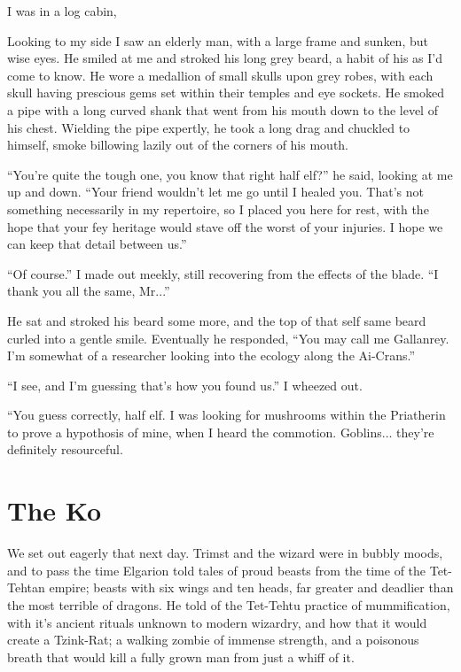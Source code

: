 \documentclass[12pt, a4paper]{book}
\begin{document}
I was in a log cabin, 

Looking to my side I saw an elderly man, with a large frame and sunken, but wise eyes. He smiled at me and stroked his long grey beard, a habit of his as I'd come to know. He wore a medallion of small skulls upon grey robes, with each skull having prescious gems set within their temples and eye sockets. He smoked a pipe with a long curved shank that went from his mouth down to the level of his chest. Wielding the pipe expertly, he took a long drag and chuckled to himself, smoke billowing lazily out of the corners of his mouth.

``You're quite the tough one, you know that right half elf?'' he said, looking at me up and down. ``Your friend wouldn't let me go until I healed you. That's not something necessarily in my repertoire, so I placed you here for rest, with the hope that your fey heritage would stave off  the worst of your injuries. I hope we can keep that detail between us.''

``Of course.'' I made out meekly, still recovering from the effects of the blade. ``I thank you all the same, Mr...''

He sat and stroked his beard some more, and the top of that self same beard curled into a gentle smile. Eventually he responded, ``You may call me Gallanrey. I'm somewhat of a researcher looking into the ecology along the Ai-Crans.''

``I see, and I'm guessing that's how you found us.'' I wheezed out.

``You guess correctly, half elf. I was looking for mushrooms within the Priatherin to prove a hypothosis of mine, when I heard the commotion. Goblins... they're definitely resourceful.

\chapter{The Ko}

We set out eagerly that next day. Trimst and the wizard were in bubbly moods, and to pass the time Elgarion told tales of proud beasts from the time of the Tet-Tehtan empire; beasts with six wings and ten heads, far greater and deadlier than the most terrible of dragons. He told of the Tet-Tehtu practice of mummification, with it's ancient rituals unknown to modern wizardry, and how that it would create a Tzink-Rat; a walking zombie of immense strength, and a poisonous breath that would kill a fully grown man from just a whiff of it. 
\end{document}
